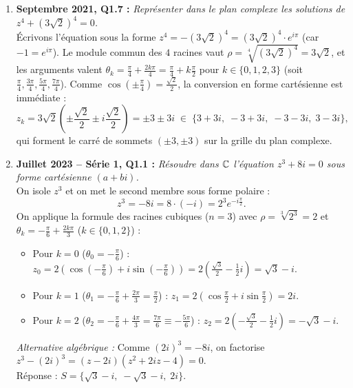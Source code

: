 \begin{exemple}
\begin{enumerate}
    \item \textbf{Septembre 2021, Q1.7 :} \emph{Représenter dans le plan complexe les solutions de $z^4 + (3\sqrt{2})^4 = 0$.}\\
    Écrivons l'équation sous la forme $z^4 = -(3\sqrt{2})^4 = (3\sqrt{2})^4 \cdot e^{i\pi}$ (car $-1 = e^{i\pi}$).
    Le module commun des $4$ racines vaut $\rho = \sqrt[4]{(3\sqrt{2})^4} = 3\sqrt{2}$, et les arguments valent $\theta_k = \frac{\pi}{4} + \frac{2k\pi}{4} = \frac{\pi}{4} + k\frac{\pi}{2}$ pour $k \in \{0, 1, 2, 3\}$ (soit $\frac{\pi}{4}, \frac{3\pi}{4}, \frac{5\pi}{4}, \frac{7\pi}{4}$).
    Comme $\cos\left(\pm\frac{\pi}{4}\right) = \frac{\sqrt{2}}{2}$, la conversion en forme cartésienne est immédiate :
    \[
        z_k = 3\sqrt{2}\left(\pm\frac{\sqrt{2}}{2} \pm i\frac{\sqrt{2}}{2}\right) = \boxed{\pm 3 \pm 3i \;\in\; \{3+3i,\; -3+3i,\; -3-3i,\; 3-3i\}},
    \]
    qui forment le carré de sommets $(\pm 3, \pm 3)$ sur la grille du plan complexe.

    \item \textbf{Juillet 2023 -- Série 1, Q1.1 :} \emph{Résoudre dans $\mathbb{C}$ l'équation $z^3 + 8i = 0$ sous forme cartésienne $(a + bi)$.}\\
    On isole $z^3$ et on met le second membre sous forme polaire :
    \[
        z^3 = -8i = 8 \cdot (-i) = 2^3 e^{-i\frac{\pi}{2}}.
    \]
    On applique la formule des racines cubiques ($n = 3$) avec $\rho = \sqrt[3]{2^3} = 2$ et $\theta_k = -\frac{\pi}{6} + \frac{2k\pi}{3}$ ($k \in \{0, 1, 2\}$) :
    \begin{itemize}
        \item Pour $k = 0$ ($\theta_0 = -\frac{\pi}{6}$) : $z_0 = 2\left(\cos\left(-\frac{\pi}{6}\right) + i\sin\left(-\frac{\pi}{6}\right)\right) = 2\left(\frac{\sqrt{3}}{2} - \frac{1}{2}i\right) = \sqrt{3} - i$.
        \item Pour $k = 1$ ($\theta_1 = -\frac{\pi}{6} + \frac{2\pi}{3} = \frac{\pi}{2}$) : $z_1 = 2\left(\cos\frac{\pi}{2} + i\sin\frac{\pi}{2}\right) = 2i$.
        \item Pour $k = 2$ ($\theta_2 = -\frac{\pi}{6} + \frac{4\pi}{3} = \frac{7\pi}{6} \equiv -\frac{5\pi}{6}$) : $z_2 = 2\left(-\frac{\sqrt{3}}{2} - \frac{1}{2}i\right) = -\sqrt{3} - i$.
    \end{itemize}
    \emph{Alternative algébrique :} Comme $(2i)^3 = -8i$, on factorise $z^3 - (2i)^3 = (z - 2i)(z^2 + 2iz - 4) = 0$.\\
    Réponse : $\boxed{S = \bigl\{\sqrt{3} - i,\; -\sqrt{3} - i,\; 2i\bigr\}}$.


\end{enumerate}
\end{exemple}

